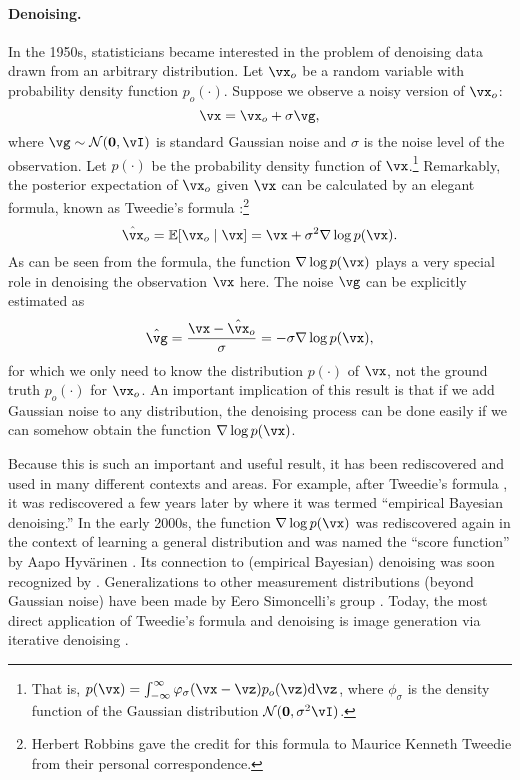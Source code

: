 \documentclass[../../book-main.tex]{subfiles}
\begin{document}
\paragraph{Denoising.} In the 1950s, statisticians became interested in the problem of denoising data drawn from an arbitrary distribution. Let \(\vx_{o}\) be a random variable with probability density function \(p_{o}(\cdot)\). Suppose we observe a noisy version of \(\vx_{o}\):
\begin{equation}
    \vx = \vx_{o} + \sigma \vg, 
\end{equation}
where \(\vg \sim \dNorm(\vzero, \vI)\) is standard Gaussian noise and \(\sigma\) is the noise level of the observation. Let \(p(\cdot)\) be the probability density function of \(\vx\).\footnote{That is, \(p(\vx) = \int_{-\infty}^{\infty} \phi_{\sigma}(\vx - \vz)p_{o}(\vz) \odif{\vz}\), where \(\phi_{\sigma}\) is the density function of the Gaussian distribution \(\mathcal{N}(\vzero, \sigma^{2} \vI)\).} Remarkably, the posterior expectation of \(\vx_{o}\) given \(\vx\) can be calculated by an elegant formula, known as Tweedie's formula \cite{Robbins1956AnEB}:\footnote{Herbert Robbins gave the credit for this formula to Maurice Kenneth Tweedie from their personal correspondence.}
\begin{equation}
    \hat{\vx}_{o} = \Ex[\vx_{o}\mid \vx] = \vx + \sigma^{2} \nabla \log p(\vx).
\end{equation}
As can be seen from the formula, the function \(\nabla \log p(\vx)\) plays a very special role in denoising the observation \(\vx\) here. The noise \(\vg\) can be explicitly estimated as
\begin{equation}
    \hat{\vg} = \frac{\vx - \hat{\vx}_{o}}{\sigma} = -\sigma \nabla \log p(\vx),
\end{equation}
for which we only need to know the distribution \(p(\cdot)\) of \(\vx\), not the ground truth \(p_{o}(\cdot)\) for \(\vx_{o}\). An important implication of this result is that if we add Gaussian noise to any distribution, the denoising process can be done easily if we can somehow obtain the function \(\nabla \log p(\vx)\).

Because this is such an important and useful result, it has been rediscovered and used in many different contexts and areas. For example, after Tweedie's formula \cite{Robbins1956AnEB}, it was rediscovered a few years later by \cite{Miyasawa61} where it was termed ``empirical Bayesian denoising.'' In the early 2000s, the function \(\nabla \log p(\vx)\) was rediscovered again in the context of learning a general distribution and was named the ``score function'' by Aapo Hyv\"{a}rinen \cite{hyvarinen05a}. Its connection to (empirical Bayesian) denoising was soon recognized by \cite{Vincent2011}.
Generalizations to other measurement distributions (beyond Gaussian noise) have been made by Eero Simoncelli's group \cite{Raphan10}. Today, the most direct application of Tweedie's formula and denoising is image generation via iterative denoising \cite{Kadkhodaie21a,ho2020denoising}.
\end{document}
